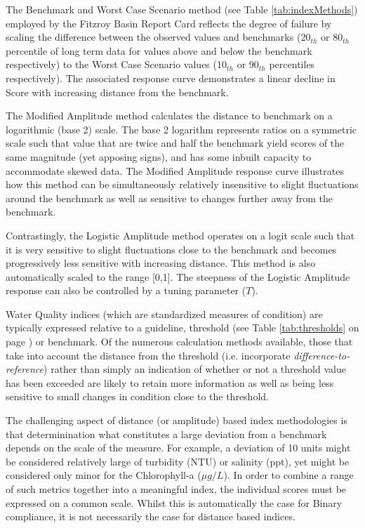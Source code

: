 The Benchmark and Worst Case Scenario method (see Table \ref{tab:indexMethods}) employed by the
Fitzroy Basin Report Card \citep{Jones-2013} reflects the degree of failure by scaling the
difference between the observed values and benchmarks (20$_{th}$ or 80$_{th}$ percentile of long
term data for values above and below the benchmark respectively) to the Worst Case Scenario values
(10$_{th}$ or 90$_{th}$ percentiles respectively).  The associated response curve demonstrates a
linear decline in Score with increasing distance from the benchmark.

The Modified Amplitude method calculates the distance to benchmark on a logarithmic (base 2) scale.
The base 2 logarithm represents ratios on a symmetric scale such that value that are twice and half
the benchmark yield scores of the same magnitude (yet apposing signs), and has some inbuilt capacity
to accommodate skewed data.  The Modified Amplitude response curve illustrates how this method can
be simultaneously relatively insensitive to slight fluctuations around the benchmark as well as
sensitive to changes further away from the benchmark.

Contrastingly, the Logistic Amplitude method operates on a logit scale such that it is very
sensitive to slight fluctuations close to the benchmark and becomes progressively less sensitive
with increasing distance.  This method is also automatically scaled to the range [0,1].  The
steepness of the Logistic Amplitude response can also be controlled by a tuning parameter ($T$).




Water Quality indices (which are standardized measures of condition) are typically expressed
relative to a guideline, threshold (see Table \ref{tab:thresholds} on page \pageref{tab:thresholds})
or benchmark. Of the numerous calculation methods available, those that take into account the
distance from the threshold (i.e. incorporate \emph{difference-to-reference}) rather than simply an
indication of whether or not a threshold value has been exceeded are likely to retain more
information as well as being less sensitive to small changes in condition close to the threshold.

The challenging aspect of distance (or amplitude) based index methodologies is that determinination
what constitutes a large deviation from a benchmark depends on the scale of the measure.  For
example, a deviation of 10 units might be considered relatively large of turbidity (NTU) or salinity
(ppt), yet might be considered only minor for the Chlorophyll-a ($\mu g/L$). In order to combine a
range of such metrics together into a meaningful index, the individual scores must be expressed on a
common scale.  Whilst this is automatically the case for Binary compliance, it is not necessarily
the case for distance based indices.
    
